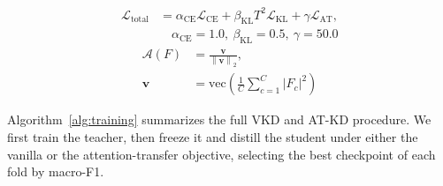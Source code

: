 \documentclass[preprint,review,12pt]{elsarticle}
\begin{document}
\begin{equation}\label{eq:9}
\begin{aligned}
\mathcal{L}_{\text{total}} &= \alpha_{\text{CE}}\mathcal{L}_{\text{CE}} + \beta_{\text{KL}}T^{2}\mathcal{L}_{\text{KL}} + \gamma\mathcal{L}_{\text{AT}}, \\
&\quad \alpha_{\text{CE}} = 1.0,\ \beta_{\text{KL}} = 0.5,\ \gamma = 50.0
\end{aligned}
\end{equation}
\begin{equation}\label{eq:10}
\begin{aligned}
\mathcal{A}(F) &= \frac{\mathbf{v}}{\left\| \mathbf{v} \right\|_{2}}, \\
\mathbf{v} &= \text{vec}\!\left( \frac{1}{C}\sum_{c=1}^{C}\left| F_{c} \right|^{2} \right)
\end{aligned}
\end{equation}

Algorithm~\ref{alg:training} summarizes the full VKD and AT-KD procedure.
We first train the teacher, then freeze it and distill the student under
either the vanilla or the attention-transfer objective, selecting the
best checkpoint of each fold by macro-F1.
\end{document}
